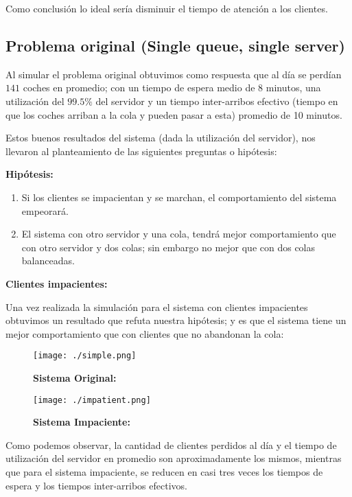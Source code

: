 \documentclass[14pt]{extarticle}
\begin{document}
Como conclusión lo ideal sería disminuir el tiempo de atención a los clientes.

\subsection{ Problema original (Single queue, single server)}

Al simular el problema original obtuvimos como respuesta que al día se perdían $141$ coches en promedio; con un tiempo de espera medio de $8$ minutos, una utilización del $99.5 \%$ del servidor y un tiempo inter-arribos efectivo (tiempo en que los coches arriban a la cola y pueden pasar a esta) promedio de 10 minutos.

Estos buenos resultados del sistema (dada la utilización del servidor), nos llevaron al planteamiento de las siguientes preguntas o hipótesis:

\textbf{Hipótesis:}

\begin{enumerate}
    \item Si los clientes se impacientan y se marchan, el comportamiento del sistema empeorará.
    \item El sistema con otro servidor y una cola, tendrá mejor comportamiento que con otro servidor y dos colas; sin embargo no mejor que con dos colas balanceadas.
\end{enumerate} 

\textbf{Clientes impacientes:}

Una vez realizada la simulación para el sistema con clientes impacientes obtuvimos un resultado que refuta nuestra hipótesis; y es que el sistema tiene un mejor comportamiento que con clientes que no abandonan la cola:

\begin{figure}[htbp]
  \centering
  \texttt{[image: ./simple.png]}
 \caption{\textbf{Sistema Original:}}
\end{figure}


\begin{figure}[htbp]
    \centering
    \texttt{[image: ./impatient.png]}
   \caption{\textbf{Sistema Impaciente:}}
  \end{figure}

Como podemos observar, la cantidad de clientes perdidos al día y el tiempo de utilización del servidor en promedio son aproximadamente los mismos, mientras que para el sistema impaciente, se reducen en casi tres veces los tiempos de espera y los tiempos inter-arribos efectivos.
\end{document}
